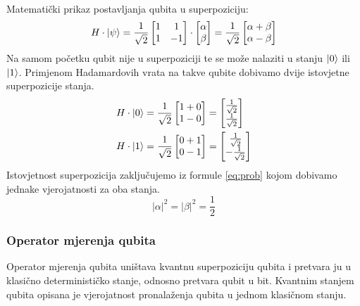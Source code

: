 \documentclass[times, utf8, zavrsni, numeric]{fer}
\begin{document}
\paragraph{}
Matematički prikaz postavljanja qubita u superpoziciju:
\begin{equation}
H\cdot \ket{\psi} = \frac{1}{\sqrt{2}}
\begin{bmatrix}
1 & 1 \\ 1 & -1
\end{bmatrix} \cdot
\begin{bmatrix}
\alpha \\ \beta
\end{bmatrix}
 = \frac{1}{\sqrt{2}}
\begin{bmatrix}
\alpha + \beta \\ \alpha - \beta
\end{bmatrix}
\end{equation}
Na samom početku qubit nije u superpoziciji te se može nalaziti u stanju $\ket{0}$ ili $\ket{1}$. Primjenom Hadamardovih vrata na takve qubite dobivamo dvije istovjetne superpozicije stanja.
\begin{align}
\begin{split}
H \cdot \ket{0} &= \frac{1}{\sqrt{2}}
\begin{bmatrix}
1 + 0 \\ 1 - 0
\end{bmatrix}
= \begin{bmatrix}
\frac{1}{\sqrt{2}} \\ \frac{1}{\sqrt{2}}
\end{bmatrix}
\\
H \cdot \ket{1} &= \frac{1}{\sqrt{2}}
\begin{bmatrix}
0 + 1 \\ 0 - 1
\end{bmatrix}
= \begin{bmatrix}
\frac{1}{\sqrt{2}} \\ -\frac{1}{\sqrt{2}}
\end{bmatrix}
\end{split}
\end{align}
Istovjetnost superpozicija zaključujemo iz formule \ref{eq:prob} kojom dobivamo jednake vjerojatnosti za oba stanja.
\begin{equation}
|\alpha|^2 = |\beta|^2 = \frac{1}{2}
\end{equation}

\subsubsection{Operator mjerenja qubita}
Operator mjerenja qubita uništava kvantnu superpoziciju qubita i pretvara ju u klasično determinističko stanje, odnosno pretvara qubit u bit. Kvantnim stanjem qubita opisana je vjerojatnost pronalaženja qubita u jednom klasičnom stanju.
\end{document}
